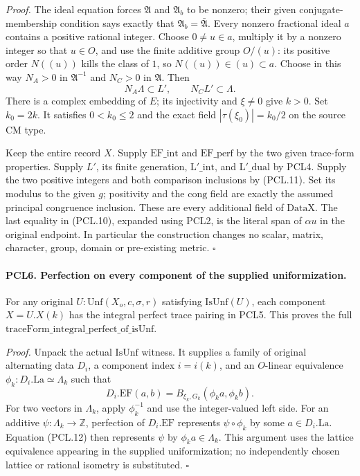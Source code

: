 \emph{Proof.}
The ideal equation forces \(\mathfrak A\) and
\(\mathfrak A_b\) to be nonzero; their given
conjugate-membership condition says exactly that
\(\mathfrak A_b=\bar{\mathfrak A}\).
Every nonzero fractional ideal \(a\) contains a
positive rational integer.  Choose \(0\ne u\in a\),
multiply it by a nonzero integer so that \(u\in O\), and
use the finite additive group \(O/(u)\): its positive
order \(N((u))\) kills the class of \(1\), so
\(N((u))\in(u)\subset a\).  Choose in this way
\(N_A>0\) in \(\mathfrak A^{-1}\) and \(N_C>0\) in
\(\mathfrak A\).  Then
\[
                N_A\Lambda\subset L',\qquad
                            N_C L'\subset\Lambda.    \tag{PCL.11}
\]
There is a complex embedding of \(E\); its injectivity
and \(\xi\ne0\) give \(k>0\).  Set \(k_0=2k\).
It satisfies \(0<k_0\le2\) and the exact field
\(|\tau(\xi_0)|=k_0/2\) on the source CM type.

Keep the entire record \(X\).  Supply \(\mathrm{EF\_int}\)
and \(\mathrm{EF\_perf}\) by the two given trace-form
properties.  Supply \(L'\), its finite generation,
\(\mathrm{L'\_int}\), and \(\mathrm{L'\_dual}\) by PCL4.
Supply the two positive integers and both comparison
inclusions by (PCL.11).  Set its modulus to the given
\(g\); positivity and the \(\mathrm{cong}\) field are
exactly the assumed principal congruence inclusion.
These are every additional field of \(\mathrm{DataX}\).
The last equality in (PCL.10), expanded using PCL2, is
the literal span of \(\alpha u\) in the original endpoint.
In particular the construction changes no scalar,
matrix, character, group, domain or pre-existing metric.
\hfill\(\square\)

\paragraph{PCL6. Perfection on every component of the supplied uniformization.}
\label{claim:PCL6}
For any original \(U:\mathrm{Unf}(X_o,c,\sigma,r)\)
satisfying \(\mathrm{IsUnf}(U)\), each component
\(X=U.X(k)\) has the integral perfect trace pairing
in PCL5.  This proves the full
\(\mathrm{traceForm\_integral\_perfect\_of\_isUnf}\).

\emph{Proof.}
Unpack the actual \(\mathrm{IsUnf}\) witness.  It supplies
a family of original alternating data \(D_i\), a component
index \(i=i(k)\), and an \(O\)-linear equivalence
\(\phi_k:D_i.\mathrm{La}\simeq\Lambda_k\) such that
\[
        D_i.\mathrm{EF}(a,b)
             =B_{\xi_k,G_k}(\phi_k a,\phi_k b).       \tag{PCL.12}
\]
For two vectors in \(\Lambda_k\), apply \(\phi_k^{-1}\)
and use the integer-valued left side.  For an additive
\(\psi:\Lambda_k\to\mathbb Z\), perfection of
\(D_i.\mathrm{EF}\) represents \(\psi\circ\phi_k\)
by some \(a\in D_i.\mathrm{La}\).  Equation (PCL.12)
then represents \(\psi\) by \(\phi_k a\in\Lambda_k\).
This argument uses the lattice equivalence appearing in
the supplied uniformization; no independently chosen
lattice or rational isometry is substituted.
\hfill\(\square\)

